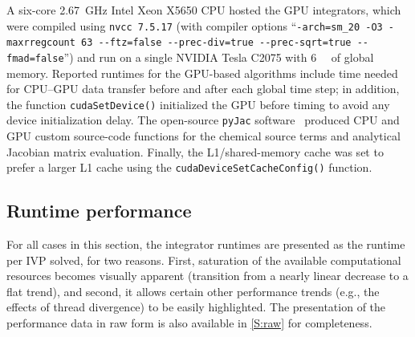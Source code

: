 \documentclass[preprint,review,11pt]{elsarticle}
\begin{document}
A six-core \SI{2.67}{\giga\hertz} Intel Xeon X5650 CPU hosted the GPU integrators, which were compiled using \texttt{nvcc 7.5.17} (with compiler options ``\texttt{-arch=sm\_20 -O3 -maxrregcount 63 -{}-ftz=false -{}-prec-div=true -{}-prec-sqrt=true -{}-fmad=false}'') and run on a single NVIDIA Tesla C2075 with \SI{6}{\giga\byte} of global memory.
Reported runtimes for the GPU-based algorithms include time needed for CPU--GPU data transfer before and after each global time step; in addition, the function \texttt{cudaSetDevice()} initialized the GPU before timing to avoid any device initialization delay.
The open-source \texttt{pyJac} software~\cite{niemeyer_2016_51139,Niemeyer:2015ws,Niemeyer:2016aa} produced CPU and GPU custom source-code functions for the chemical source terms and analytical Jacobian matrix evaluation.
Finally, the L1\slash shared-memory cache was set to prefer a larger L1 cache using the \texttt{cudaDeviceSetCacheConfig()} function.

\subsection{Runtime performance}
\label{S:perf}

For all cases in this section, the integrator runtimes are presented as the runtime per IVP solved, for two reasons.
First, saturation of the available computational resources becomes visually apparent (transition from a nearly linear decrease to a flat trend), and second, it allows certain other performance trends (e.g., the effects of thread divergence) to be easily highlighted.
The presentation of the performance data in raw form is also available in \ref{S:raw} for completeness.
\end{document}
